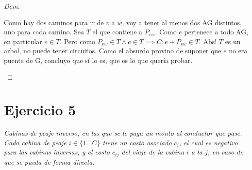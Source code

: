 \documentclass[12pt, a4paper]{report}
\theoremstyle{definition} %
\begin{document}
\begin{proof}[Dem]
\begin{enumerate}
        Como hay dos caminos para ir de $v$ a $w$, voy a tener al menos dos AG distintos, uno para cada camino. Sea $T$ el que contiene a $P_{vw}$. Como $e$ pertenece a todo AG, en particular $e \in T$. Pero como $P_{vw} \in T \wedge e \in T \implies C: e + P_{vw} \in T$. Abs! $T$ es un arbol, no puede tener circuitos. Como el absurdo provino de suponer que $e$ no era puente de G, concluyo que sí lo es, que es lo que quería probar.

    \end{enumerate}

\end{proof}

\newpage
\section*{Ejercicio 5}

\textit{Cabinas de peaje inverso, en las que se le paga un monto al conductor que pase. Cada cabina de peaje $i \in \{1 \dotso C \}$ tiene un costo asociado $c_i$, el cual es negativo para las cabinas inversas, y el costo $c_{ij}$ del viaje de la cabina $i$ a la $j$, en caso de que se pueda de forma directa.}
\end{document}
